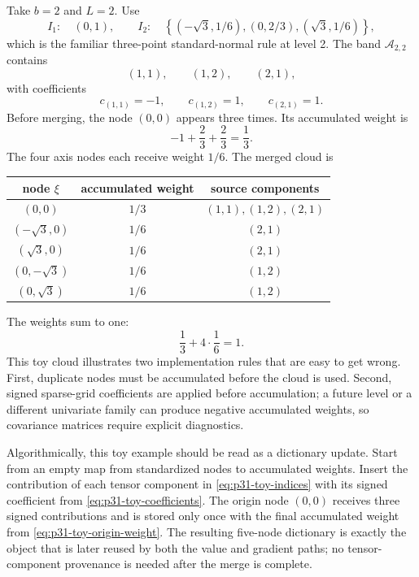 \documentclass[11pt]{article}
\numberwithin{equation}{section}
\begin{document}
Take \(b=2\) and \(L=2\).
Use
\begin{equation}
  I_1:\quad (0,1),
  \qquad
  I_2:\quad
  \left\{(-\sqrt3,1/6),(0,2/3),(\sqrt3,1/6)\right\},
  \label{eq:p31-toy-univariate}
\end{equation}
which is the familiar three-point standard-normal rule at level 2.  The band
\(\mathcal A_{2,2}\) contains
\begin{equation}
  (1,1),\qquad (1,2),\qquad (2,1),
  \label{eq:p31-toy-indices}
\end{equation}
with coefficients
\begin{equation}
  c_{(1,1)}=-1,\qquad c_{(1,2)}=1,\qquad c_{(2,1)}=1.
  \label{eq:p31-toy-coefficients}
\end{equation}
Before merging, the node \((0,0)\) appears three times.  Its accumulated weight
is
\begin{equation}
  -1+\frac23+\frac23=\frac13.
  \label{eq:p31-toy-origin-weight}
\end{equation}
The four axis nodes each receive weight \(1/6\).  The merged cloud is
\begin{center}
\begin{tabular}{ccc}
\toprule
node \(\xi\) & accumulated weight & source components \\
\midrule
\((0,0)\) & \(1/3\) & \((1,1),(1,2),(2,1)\) \\
\((-\sqrt3,0)\) & \(1/6\) & \((2,1)\) \\
\((\sqrt3,0)\) & \(1/6\) & \((2,1)\) \\
\((0,-\sqrt3)\) & \(1/6\) & \((1,2)\) \\
\((0,\sqrt3)\) & \(1/6\) & \((1,2)\) \\
\bottomrule
\end{tabular}
\end{center}
The weights sum to one:
\begin{equation}
  \frac13+4\cdot\frac16=1.
  \label{eq:p31-toy-weight-total}
\end{equation}
This toy cloud illustrates two implementation rules that are easy to get
wrong.  First, duplicate nodes must be accumulated before the cloud is used.
Second, signed sparse-grid coefficients are applied before accumulation; a
future level or a different univariate family can produce negative accumulated
weights, so covariance matrices require explicit diagnostics.

Algorithmically, this toy example should be read as a dictionary update.  Start
from an empty map from standardized nodes to accumulated weights.  Insert the
contribution of each tensor component in \eqref{eq:p31-toy-indices} with its
signed coefficient from \eqref{eq:p31-toy-coefficients}.  The origin node
\((0,0)\) receives three signed contributions and is stored only once with the
final accumulated weight from \eqref{eq:p31-toy-origin-weight}.  The resulting
five-node dictionary is exactly the object that is later reused by both the
value and gradient paths; no tensor-component provenance is needed after the
merge is complete.
\end{document}
